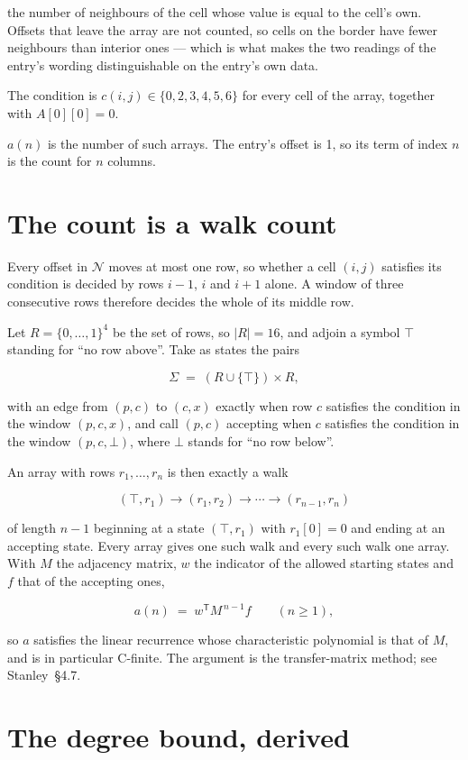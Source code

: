 \documentclass[11pt]{article}
\theoremstyle{definition}
\begin{document}
the number of neighbours of the cell whose value is equal to the cell's own. Offsets that leave the array are not counted, so cells on the border have fewer neighbours than interior ones --- which is what makes the two readings of the entry's wording distinguishable on the entry's own data.

The condition is $c(i,j) \in \{0, 2, 3, 4, 5, 6\}$ for every cell of the array, together with $A[0][0]=0$.

$a(n)$ is the number of such arrays. The entry's offset is 1, so its term of index $n$ is the count for $n$ columns.

\section{The count is a walk count}

Every offset in $\mathcal{N}$ moves at most one row, so whether a cell $(i,j)$ satisfies its condition is decided by rows $i-1$, $i$ and $i+1$ alone. A window of three consecutive rows therefore decides the whole of its middle row.

Let $R = \{0,\dots,1\}^{4}$ be the set of rows, so $|R| = 16$, and adjoin a symbol $\top$ standing for ``no row above''. Take as states the pairs

\[\Sigma \;=\; (R \cup \{\top\}) \times R,\]

with an edge from $(p,c)$ to $(c,x)$ exactly when row $c$ satisfies the condition in the window $(p,c,x)$, and call $(p,c)$ accepting when $c$ satisfies the condition in the window $(p,c,\bot)$, where $\bot$ stands for ``no row below''.

An array with rows $r_1,\dots,r_n$ is then exactly a walk

\[(\top,r_1) \to (r_1,r_2) \to \cdots \to (r_{n-1},r_n)\]

of length $n-1$ beginning at a state $(\top,r_1)$ with $r_1[0]=0$ and ending at an accepting state. Every array gives one such walk and every such walk one array. With $M$ the adjacency matrix, $w$ the indicator of the allowed starting states and $f$ that of the accepting ones,

\[a(n) \;=\; w^{\mathsf T} M^{\,n-1} f \qquad (n \ge 1),\]

so $a$ satisfies the linear recurrence whose characteristic polynomial is that of $M$, and is in particular C-finite. The argument is the transfer-matrix method; see Stanley~\S4.7.

\section{The degree bound, derived}
\end{document}
